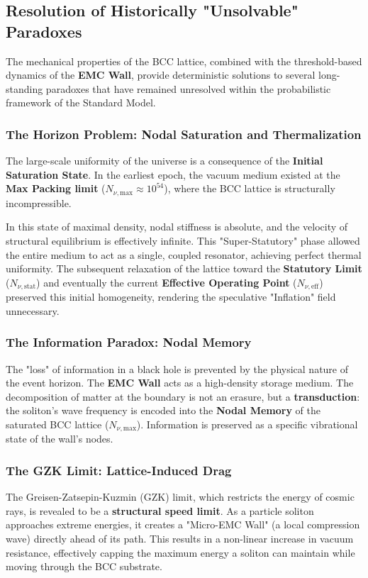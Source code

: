 \documentclass[10pt,a4paper]{article}
\begin{document}
\subsection{Resolution of Historically "Unsolvable" Paradoxes}

The mechanical properties of the BCC lattice, combined with the threshold-based dynamics of the \textbf{EMC Wall}, provide deterministic solutions to several long-standing paradoxes that have remained unresolved within the probabilistic framework of the Standard Model.

\subsubsection*{The Horizon Problem: Nodal Saturation and Thermalization}
The large-scale uniformity of the universe is a consequence of the \textbf{Initial Saturation State}. In the earliest epoch, the vacuum medium existed at the \textbf{Max Packing limit} ($N_{\nu, \text{max}} \approx 10^{54}$), where the BCC lattice is structurally incompressible. 

In this state of maximal density, nodal stiffness is absolute, and the velocity of structural equilibrium is effectively infinite. This "Super-Statutory" phase allowed the entire medium to act as a single, coupled resonator, achieving perfect thermal uniformity. The subsequent relaxation of the lattice toward the \textbf{Statutory Limit} ($N_{\nu, \text{stat}}$) and eventually the current \textbf{Effective Operating Point} ($N_{\nu, \text{eff}}$) preserved this initial homogeneity, rendering the speculative "Inflation" field unnecessary.

\subsubsection*{The Information Paradox: Nodal Memory}
The "loss" of information in a black hole is prevented by the physical nature of the event horizon. The \textbf{EMC Wall} acts as a high-density storage medium. The decomposition of matter at the boundary is not an erasure, but a \textbf{transduction}: the soliton’s wave frequency is encoded into the \textbf{Nodal Memory} of the saturated BCC lattice ($N_{\nu, \text{max}}$). Information is preserved as a specific vibrational state of the wall's nodes.

\subsubsection*{The GZK Limit: Lattice-Induced Drag}
The Greisen-Zatsepin-Kuzmin (GZK) limit, which restricts the energy of cosmic rays, is revealed to be a \textbf{structural speed limit}. As a particle soliton approaches extreme energies, it creates a "Micro-EMC Wall" (a local compression wave) directly ahead of its path. This results in a non-linear increase in vacuum resistance, effectively capping the maximum energy a soliton can maintain while moving through the BCC substrate.
\end{document}
